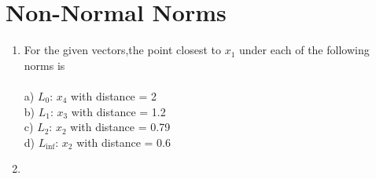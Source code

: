 \documentclass[english]{article}
\begin{document}
\section{Non-Normal Norms}

\begin{enumerate}
\item

For the given vectors,the point closest to $x_1$ under each of the following norms is \\\\
a) $L_0$: $x_4$ with distance = 2 \\
b) $L_1$: $x_3$ with distance = 1.2 \\
c) $L_2$: $x_2$ with distance = 0.79 \\
d) $L_{\inf}$: $x_2$ with distance = 0.6 \\

\item


\end{enumerate}
\end{document}
